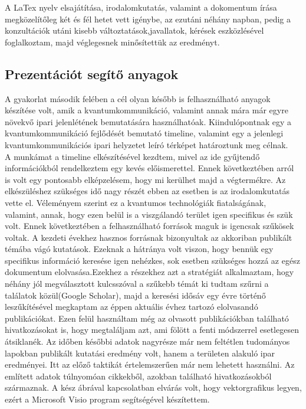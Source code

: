 \clearpage

A LaTex nyelv elsajátítása, irodalomkutatás, valamint a dokomentum írása megközelítőleg két és fél hetet vett igénybe, az ezutáni néhány napban, pedig a konzultációk utáni kisebb változtatások,javallatok, kérések eszközlésével foglalkoztam, majd véglegesnek minősítettük az eredményt.

\subsection *{Prezentációt segítő anyagok}

A gyakorlat második felében a cél olyan később is felhasználható anyagok készítése volt, amik a kvantumkommunikáció, valamint annak mára már egyre növekvő ipari jelenlétének bemutatására használhatóak. Kiindulópontnak egy a kvantumkommunikáció fejlődését bemutató timeline, valamint egy a jelenlegi kvantumkommunikációs ipari helyzetet leíró térképet határoztunk meg célnak.\\ 
A munkámat a timeline elkészítésével kezdtem, mivel az ide gyűjtendő információkból rendelkeztem egy kevés előismerettel. Ennek következtében arról is volt egy pontosabb elképzelésem, hogy mi kerülhet majd a végtermékre. Az elkészüléshez szükséges idő nagy részét ebben az esetben is az irodalomkutatás vette el.  Véleményem szerint ez a kvantumos technológiák fiatalságának, valamint, annak, hogy ezen belül is a viszgálandó terület igen specifikus és szük volt. Ennek következtében a felhasználható források maguk is igencsak szűkösek voltak. A kezdeti évekhez hasznos forrásnak bizonyultak az akkoriban publikált témába vágó kutatások. Ezeknak a hátránya volt viszon, hogy bennük egy specifikus információ keresése igen nehézkes, sok esetben szükséges hozzá az egész dokumentum elolvasása.Ezekhez a részekhez azt a stratégiát alkalmaztam, hogy néhány jól megválasztott kulcsszóval a szűkebb témát ki tudtam szűrni a találatok közül(Google Scholar), majd a keresési idősáv egy évre történő leszűkítésével megkaptam az éppen aktuális évhez tartozó elolvasandó publikációkat. Ezen felül használtam még az olvasott publikációkban található hivatkozásokat is, hogy megtaláljam azt, ami fölött a fenti módszerrel esetlegesen átsiklanék. Az időben  későbbi adatok nagyrésze már nem feltétlen tudományos lapokban publikált kutatási eredmény volt, hanem a területen alakuló ipar eredményei. Itt az előző taktikát értelemszerűen már nem lehetett használni. Az említett adatok túlnyomóan cikkekből, azokban található hivatkozásokból származnak. A kész ábrával kapcsolatban elvárás volt, hogy vektorgrafikus legyen, ezért a Microsoft Visio program segítségével készítettem.\\
